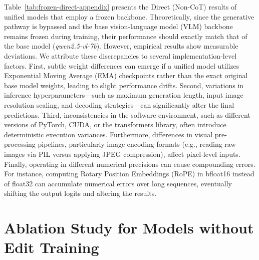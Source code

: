 \documentclass{article}
\theoremstyle{plain}
\theoremstyle{definition}
\theoremstyle{remark}
\begin{document}
Table~\ref{tab:frozen-direct-appendix} presents the Direct (Non-CoT) results of unified models that employ a frozen backbone. Theoretically, since the generative pathway is bypassed and the base vision-language model (VLM) backbone remains frozen during training, their performance should exactly match that of the base model (\textit{qwen2.5-vl-7b}). However, empirical results show measurable deviations. We attribute these discrepancies to several implementation-level factors. First, subtle weight differences can emerge if a unified model utilizes Exponential Moving Average (EMA) checkpoints rather than the exact original base model weights, leading to slight performance drifts. Second, variations in inference hyperparameters—such as maximum generation length, input image resolution scaling, and decoding strategies—can significantly alter the final predictions. Third, inconsistencies in the software environment, such as different versions of PyTorch, CUDA, or the transformers library, often introduce deterministic execution variances. Furthermore, differences in visual pre-processing pipelines, particularly image encoding formats (e.g., reading raw images via PIL versus applying JPEG compression), affect pixel-level inputs. Finally, operating in different numerical precisions can cause compounding errors. For instance, computing Rotary Position Embeddings (RoPE) in bfloat16 instead of float32 can accumulate numerical errors over long sequences, eventually shifting the output logits and altering the results.


\section{Ablation Study for Models without Edit Training}
\label{sec:appendix_ood_ablation}
\end{document}
